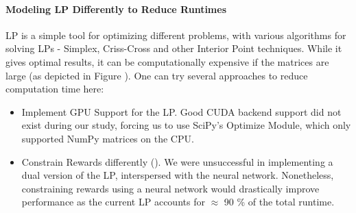 \documentclass[12pt]{article}
\begin{document}
    \paragraph{Modeling LP Differently to Reduce Runtimes} LP is a simple tool for optimizing different problems, with various algorithms for solving LPs - Simplex, Criss-Cross and other Interior Point techniques. While it gives optimal results, it can be computationally expensive if the matrices are large (as depicted in Figure ). One can try several approaches to reduce computation time here:
    \begin{itemize}
        \item Implement GPU Support for the LP. Good CUDA backend support did not exist during our study, forcing us to use SciPy's Optimize Module, which only supported NumPy matrices on the CPU.
        \item Constrain Rewards differently (). We were unsuccessful in implementing a dual version of the LP, interspersed with the neural network. Nonetheless, constraining rewards using a neural network would drastically improve performance as the current LP accounts for $\approx$ 90 \% of the total runtime.
    \end{itemize}

    
    
    
    \cleardoublepage
    
\end{document}
